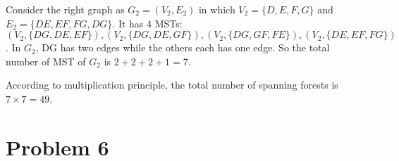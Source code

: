 \documentclass[paper=a4, fontsize=11pt]{scrartcl} %
\numberwithin{figure}{section} %
\numberwithin{table}{section} %
\begin{document}
Consider the right graph as $G_2 = (V_2, E_2)$ in which $V_2 = \{D, E, F, G\}$ and $E_2 = \{DE, EF, FG, DG\}$.
It has 4 MSTs: $(V_2, \{DG, DE, EF\}), (V_2, \{DG, DE, GF\}), (V_2, \{DG, GF, FE\}), (V_2, \{DE, EF, FG\})$.
In $G_2$, DG has two edges while the others each has one edge. So the total number of MST of $G_2$ is $2 + 2 + 2 + 1 = 7$.

According to multiplication principle, the total number of spanning forests is $7 \times 7 = 49$.



\section*{Problem 6}
\end{document}
